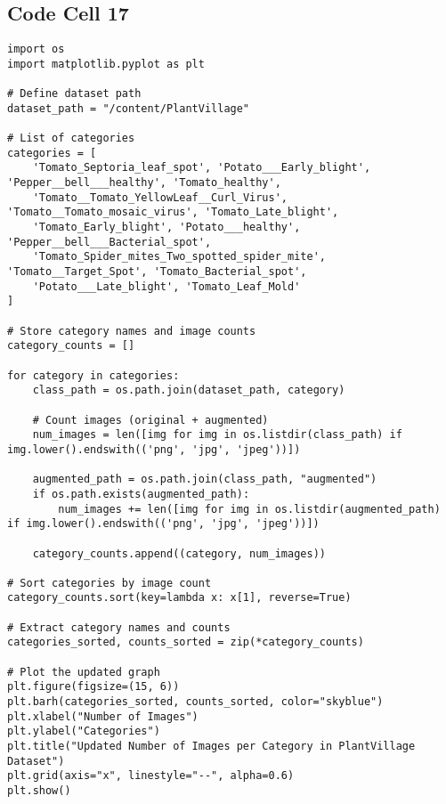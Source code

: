 \documentclass{article}
\begin{document}
\subsection*{Code Cell 17}
\begin{lstlisting}
import os
import matplotlib.pyplot as plt

# Define dataset path
dataset_path = "/content/PlantVillage"

# List of categories
categories = [
    'Tomato_Septoria_leaf_spot', 'Potato___Early_blight', 'Pepper__bell___healthy', 'Tomato_healthy',
    'Tomato__Tomato_YellowLeaf__Curl_Virus', 'Tomato__Tomato_mosaic_virus', 'Tomato_Late_blight',
    'Tomato_Early_blight', 'Potato___healthy', 'Pepper__bell___Bacterial_spot',
    'Tomato_Spider_mites_Two_spotted_spider_mite', 'Tomato__Target_Spot', 'Tomato_Bacterial_spot',
    'Potato___Late_blight', 'Tomato_Leaf_Mold'
]

# Store category names and image counts
category_counts = []

for category in categories:
    class_path = os.path.join(dataset_path, category)

    # Count images (original + augmented)
    num_images = len([img for img in os.listdir(class_path) if img.lower().endswith(('png', 'jpg', 'jpeg'))])

    augmented_path = os.path.join(class_path, "augmented")
    if os.path.exists(augmented_path):
        num_images += len([img for img in os.listdir(augmented_path) if img.lower().endswith(('png', 'jpg', 'jpeg'))])

    category_counts.append((category, num_images))

# Sort categories by image count
category_counts.sort(key=lambda x: x[1], reverse=True)

# Extract category names and counts
categories_sorted, counts_sorted = zip(*category_counts)

# Plot the updated graph
plt.figure(figsize=(15, 6))
plt.barh(categories_sorted, counts_sorted, color="skyblue")
plt.xlabel("Number of Images")
plt.ylabel("Categories")
plt.title("Updated Number of Images per Category in PlantVillage Dataset")
plt.grid(axis="x", linestyle="--", alpha=0.6)
plt.show()
\end{lstlisting}
\end{document}
